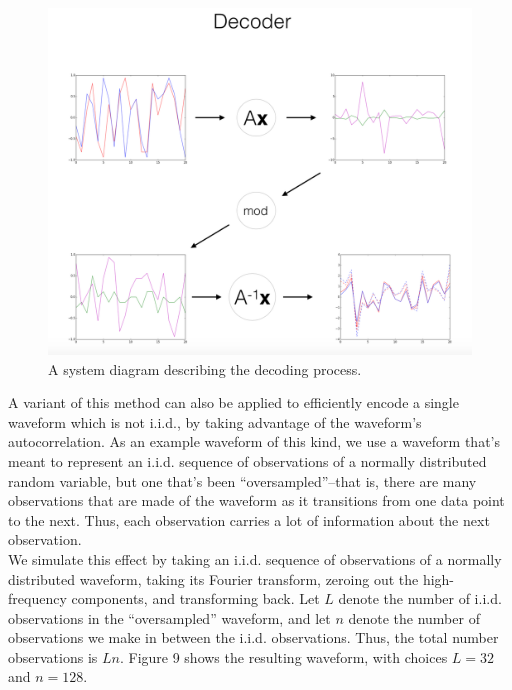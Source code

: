 \documentclass{amsart}
\begin{document}
\begin{figure} 
\begin{center} 
\includegraphics[scale=0.4]{decoderdiagram.png} 
\caption{A system diagram describing the decoding process. %
}
\end{center}
\end{figure}


A variant of this method can also be applied to efficiently encode a single waveform which is not i.i.d., by taking advantage of the waveform's autocorrelation. As an example waveform of this kind, we use a waveform that's meant to represent an i.i.d. sequence of observations of a normally distributed random variable, but one that's been ``oversampled''--that is, there are many observations that are made of the waveform as it transitions from one data point to the next. Thus, each observation carries a lot of information about the next observation. \\

We simulate this effect by taking an i.i.d. sequence of observations of a normally distributed waveform, taking its Fourier transform, zeroing out the high-frequency components, and transforming back. Let $L$ denote the number of i.i.d. observations in the ``oversampled'' waveform, and let $n$ denote the number of observations we make in between the i.i.d. observations. Thus, the total number observations is $Ln$. Figure 9 shows the resulting waveform, with choices $L=32$ and $n=128$. \\
\end{document}
